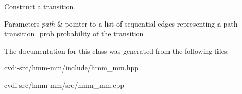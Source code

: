 Construct a transition. 


\begin{DoxyParams}{Parameters}
{\em path} & pointer to a list of sequential edges representing a path  transition\+\_\+prob probability of the transition \\
\hline
\end{DoxyParams}


The documentation for this class was generated from the following files\+:\begin{DoxyCompactItemize}
\item 
cvdi-\/src/hmm-\/mm/include/hmm\+\_\+mm.\+hpp\item 
cvdi-\/src/hmm-\/mm/src/hmm\+\_\+mm.\+cpp\end{DoxyCompactItemize}
